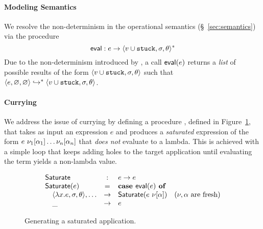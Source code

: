 \paragraph{Modeling Semantics}
%
We resolve the non-determinism in the operational semantics
(\S~\ref{sec:semantics}) via the procedure
%
$$
\mathsf{eval} : e \rightarrow \langle v \cup \mathtt{stuck}, \sigma, \theta \rangle^{*}
$$
%
Due to the non-determinism introduced by \gensym, a call
$\mathsf{eval}(e)$ returns a \emph{list}
of possible results of the form $\langle v \cup \mathtt{stuck}, \sigma, \theta \rangle$
such that $\langle e, \varnothing, \varnothing \rangle \hookrightarrow^{*} \langle v \cup \mathtt{stuck}, \sigma, \theta \rangle{}$.

\paragraph{Currying}
We address the issue of currying by defining a procedure ,
defined in Figure~\ref{fig:algo-gen-args}, that takes as input an
expression $e$ and produces a \emph{saturated} expression of the form
$e\ \nu_1[\alpha_1] \ldots \nu_n[\alpha_n]$ that
\emph{does not} evaluate to a lambda.
%
This is achieved with a simple loop that keeps adding holes to the
target application until evaluating the term yields a non-lambda value.
%
%

\begin{figure}[t]
$$
\begin{array}{lclr}
\mathsf{Saturate}   & : & e \rightarrow e \\
\mathsf{Saturate}(e) & = & \mbox{\textbf{case }} \mathsf{eval}(e) \mbox{\textbf{ of}} \\
 \quad \langle \lambda x. e, \sigma, \theta \rangle,\ldots &\rightarrow& \mathsf{Saturate}(e\ \nu[\alpha]) & (\nu, \alpha \mbox{ are fresh}) \\
 \quad \_ &\rightarrow& e \\
\end{array}
$$
\caption{Generating a saturated application.}
\label{fig:algo-gen-args}

\end{figure}

